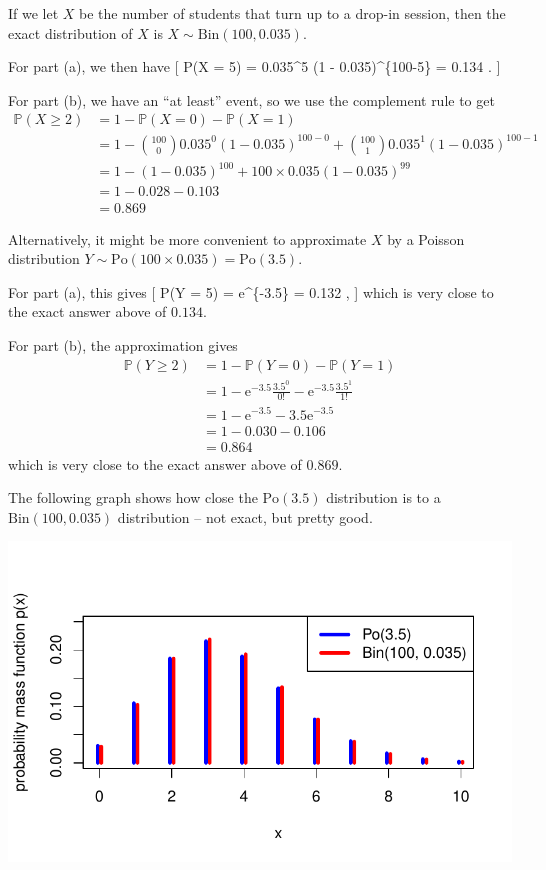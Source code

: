 \documentclass[
  letterpaper,
]{report}
\theoremstyle{definition}
\theoremstyle{definition}
\theoremstyle{remark}
\begin{document}
If we let \(X\) be the number of students that turn up to a drop-in
session, then the exact distribution of \(X\) is
\(X \sim \text{Bin}(100, 0.035)\).

For part (a), we then have {[} \mathbb P(X = 5) = 
0.035\^{}5 (1 - 0.035)\^{}\{100-5\} = 0.134 . {]}

For part (b), we have an ``at least'' event, so we use the complement
rule to get \begin{align*}
\mathbb P(X \geq 2)
&= 1 - \mathbb P(X = 0) - \mathbb P(X = 1) \\
&= 1 - \binom{100}{0} 0.035^0 (1 - 0.035)^{100-0} + \binom{100}{1} 0.035^1 (1 - 0.035)^{100 - 1} \\
&= 1 - (1 - 0.035)^{100} + 100 \times 0.035 (1 - 0.035)^{99} \\
&= 1 - 0.028 - 0.103 \\
&= 0.869
\end{align*}

Alternatively, it might be more convenient to approximate \(X\) by a
Poisson distribution
\(Y \sim \text{Po}(100 \times 0.035) = \text{Po}(3.5)\).

For part (a), this gives {[} \mathbb P(Y = 5) = \mathrm e\^{}\{-3.5\}
 = 0.132 , {]} which is very close to the exact answer
above of \(0.134\).

For part (b), the approximation gives \begin{align*}
\mathbb P(Y \geq 2)
&= 1 - \mathbb P(Y = 0) - \mathbb P(Y = 1) \\
&= 1 - \mathrm e^{-3.5} \frac{3.5^0}{0!} - \mathrm e^{-3.5} \frac{3.5^1}{1!} \\
&= 1 - \mathrm e^{-3.5} - 3.5 \mathrm e^{-3.5} \\
&= 1 - 0.030 - 0.106 \\
&= 0.864
\end{align*} which is very close to the exact answer above of \(0.869\).

The following graph shows how close the \(\text{Po}(3.5)\) distribution
is to a \(\text{Bin}(100, 0.035)\) distribution -- not exact, but pretty
good.

\includegraphics{sections/L12-poisson_files/figure-pdf/po-binom-pic-1.pdf}
\end{document}

